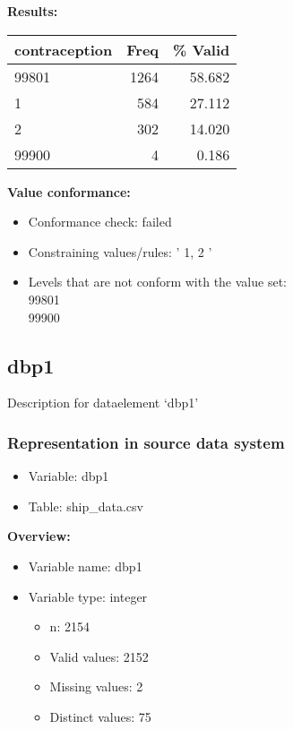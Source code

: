 \documentclass[
]{article}
\providecommand{\tightlist}{%
  \setlength{\itemsep}{0pt}\setlength{\parskip}{0pt}}
\begin{document}
\textbf{Results:}\\

\begin{table}[H]
\centering
\begin{tabular}{l|r|r}
\hline
\textbf{contraception} & \textbf{Freq} & \textbf{\% Valid}\\
\hline
99801 & 1264 & 58.682\\
\hline
1 & 584 & 27.112\\
\hline
2 & 302 & 14.020\\
\hline
99900 & 4 & 0.186\\
\hline
\end{tabular}
\end{table}

\textbf{Value conformance:}

\begin{itemize}
\tightlist
\item
  Conformance check: failed
\item
  Constraining values/rules: ' 1, 2 '
\item
  Levels that are not conform with the value set:\\
  99801\\
  99900
\end{itemize}

\newpage

\hypertarget{dbp1}{%
\subsection{dbp1}\label{dbp1}}

Description for dataelement `dbp1'

\hypertarget{representation-in-source-data-system-3}{%
\subsubsection{\texorpdfstring{Representation in \textbf{source} data
system}{Representation in source data system}}\label{representation-in-source-data-system-3}}

\begin{itemize}
\tightlist
\item
  Variable: dbp1
\item
  Table: ship\_data.csv
\end{itemize}

\textbf{Overview:}

\begin{itemize}
\tightlist
\item
  Variable name: dbp1
\item
  Variable type: integer

  \begin{itemize}
  \tightlist
  \item
    n: 2154
  \item
    Valid values: 2152
  \item
    Missing values: 2
  \item
    Distinct values: 75
  \end{itemize}
\end{itemize}
\end{document}
